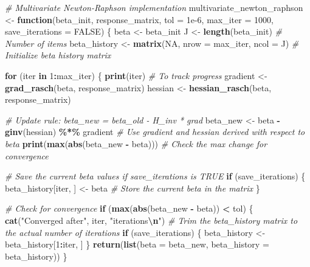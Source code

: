 \documentclass[
]{article}
\newenvironment{Shaded}{\begin{snugshade}}{\end{snugshade}}
\newcommand{\AttributeTok}[1]{\textcolor[rgb]{0.13,0.29,0.53}{#1}}
\newcommand{\CommentTok}[1]{\textcolor[rgb]{0.56,0.35,0.01}{\textit{#1}}}
\newcommand{\ConstantTok}[1]{\textcolor[rgb]{0.56,0.35,0.01}{#1}}
\newcommand{\ControlFlowTok}[1]{\textcolor[rgb]{0.13,0.29,0.53}{\textbf{#1}}}
\newcommand{\DecValTok}[1]{\textcolor[rgb]{0.00,0.00,0.81}{#1}}
\newcommand{\FloatTok}[1]{\textcolor[rgb]{0.00,0.00,0.81}{#1}}
\newcommand{\FunctionTok}[1]{\textcolor[rgb]{0.13,0.29,0.53}{\textbf{#1}}}
\newcommand{\NormalTok}[1]{#1}
\newcommand{\OtherTok}[1]{\textcolor[rgb]{0.56,0.35,0.01}{#1}}
\newcommand{\SpecialCharTok}[1]{\textcolor[rgb]{0.81,0.36,0.00}{\textbf{#1}}}
\newcommand{\StringTok}[1]{\textcolor[rgb]{0.31,0.60,0.02}{#1}}
\begin{document}
\begin{Shaded}
\begin{Highlighting}[]
\CommentTok{\# Multivariate Newton{-}Raphson implementation}
\NormalTok{multivariate\_newton\_raphson }\OtherTok{\textless{}{-}} \ControlFlowTok{function}\NormalTok{(beta\_init, response\_matrix, }\AttributeTok{tol =} \FloatTok{1e{-}6}\NormalTok{, }\AttributeTok{max\_iter =} \DecValTok{1000}\NormalTok{, }\AttributeTok{save\_iterations =} \ConstantTok{FALSE}\NormalTok{) \{}
\NormalTok{  beta }\OtherTok{\textless{}{-}}\NormalTok{ beta\_init}
\NormalTok{  J }\OtherTok{\textless{}{-}} \FunctionTok{length}\NormalTok{(beta\_init)  }\CommentTok{\# Number of items}
\NormalTok{  beta\_history }\OtherTok{\textless{}{-}} \FunctionTok{matrix}\NormalTok{(}\ConstantTok{NA}\NormalTok{, }\AttributeTok{nrow =}\NormalTok{ max\_iter, }\AttributeTok{ncol =}\NormalTok{ J)  }\CommentTok{\# Initialize beta history matrix}
  
  \ControlFlowTok{for}\NormalTok{ (iter }\ControlFlowTok{in} \DecValTok{1}\SpecialCharTok{:}\NormalTok{max\_iter) \{}
    \FunctionTok{print}\NormalTok{(iter) }\CommentTok{\# To track progress}
\NormalTok{    gradient }\OtherTok{\textless{}{-}} \FunctionTok{grad\_rasch}\NormalTok{(beta, response\_matrix)}
\NormalTok{    hessian }\OtherTok{\textless{}{-}} \FunctionTok{hessian\_rasch}\NormalTok{(beta, response\_matrix)}
    
    \CommentTok{\# Update rule: beta\_new = beta\_old {-} H\_inv * grad}
\NormalTok{    beta\_new }\OtherTok{\textless{}{-}}\NormalTok{ beta }\SpecialCharTok{{-}} \FunctionTok{ginv}\NormalTok{(hessian) }\SpecialCharTok{\%*\%}\NormalTok{ gradient }\CommentTok{\# Use gradient and hessian derived with respect to beta}
    \FunctionTok{print}\NormalTok{(}\FunctionTok{max}\NormalTok{(}\FunctionTok{abs}\NormalTok{(beta\_new }\SpecialCharTok{{-}}\NormalTok{ beta)))  }\CommentTok{\# Check the max change for convergence}
    
    \CommentTok{\# Save the current beta values if save\_iterations is TRUE}
    \ControlFlowTok{if}\NormalTok{ (save\_iterations) \{}
\NormalTok{      beta\_history[iter, ] }\OtherTok{\textless{}{-}}\NormalTok{ beta  }\CommentTok{\# Store the current beta in the matrix}
\NormalTok{    \}}
    
    \CommentTok{\# Check for convergence}
    \ControlFlowTok{if}\NormalTok{ (}\FunctionTok{max}\NormalTok{(}\FunctionTok{abs}\NormalTok{(beta\_new }\SpecialCharTok{{-}}\NormalTok{ beta)) }\SpecialCharTok{\textless{}}\NormalTok{ tol) \{}
      \FunctionTok{cat}\NormalTok{(}\StringTok{"Converged after"}\NormalTok{, iter, }\StringTok{"iterations}\SpecialCharTok{\textbackslash{}n}\StringTok{"}\NormalTok{)}
      \CommentTok{\# Trim the beta\_history matrix to the actual number of iterations}
      \ControlFlowTok{if}\NormalTok{ (save\_iterations) \{}
\NormalTok{        beta\_history }\OtherTok{\textless{}{-}}\NormalTok{ beta\_history[}\DecValTok{1}\SpecialCharTok{:}\NormalTok{iter, ]}
\NormalTok{      \}}
      \FunctionTok{return}\NormalTok{(}\FunctionTok{list}\NormalTok{(}\AttributeTok{beta =}\NormalTok{ beta\_new, }\AttributeTok{beta\_history =}\NormalTok{ beta\_history))}
\NormalTok{    \}}
    

\end{Highlighting}
\end{Shaded}
\end{document}
